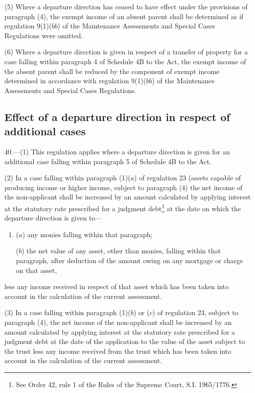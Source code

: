 \documentclass[a4paper]{article}
\begin{document}
(5) Where a departure direction has ceased to have effect under the provisions of paragraph (4), the exempt income of an absent parent shall be determined as if regulation 9(1)($bb$) of the Maintenance Assessments and Special Cases Regulations were omitted.

(6) Where a departure direction is given in respect of a transfer of property for a case falling within paragraph 4 of Schedule 4B to the Act, the exempt income of the absent parent shall be reduced by the component of exempt income determined in accordance with regulation 9(1)($bb$) of the Maintenance Assessments and Special Cases Regulations.

\subsection[40. Effect of a departure direction in respect of additional cases]{Effect of a departure direction in respect of additional cases}

40.—(1) This regulation applies where a departure direction is given for an additional case falling within paragraph 5 of Schedule 4B to the Act.

(2) In a case falling within paragraph (1)($a$) of regulation 23 (assets capable of producing income or higher income, subject to paragraph (4) the net income of the non-applicant shall be increased by an amount calculated by applying interest at the statutory rate prescribed for a judgment debt\footnote{\frenchspacing See Order 42, rule 1 of the Rules of the Supreme Court, S.I. 1965/1776.} at the date on which the departure direction is given to—
\begin{enumerate}\item[]
($a$) any monies falling within that paragraph;

($b$) the net value of any asset, other than monies, falling within that paragraph, after deduction of the amount owing on any mortgage or charge on that asset,
\end{enumerate}
less any income received in respect of that asset which has been taken into account in the calculation of the current assessment.

(3) In a case falling within paragraph (1)($b$) or ($c$) of regulation 23, subject to paragraph (4), the net income of the non-applicant shall be increased by an amount calculated by applying interest at the statutory rate prescribed for a judgment debt at the date of the application to the value of the asset subject to the trust less any income received from the trust which has been taken into account in the calculation of the current assessment.
\end{document}
